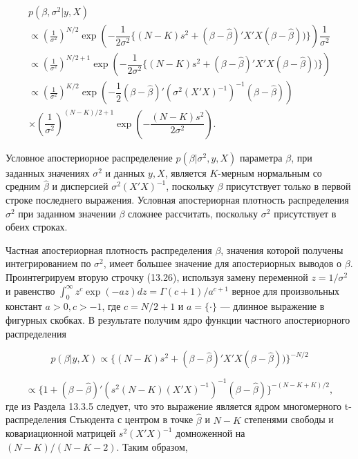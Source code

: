 \begin{multline}
p(\beta,\sigma^{2}|y,X) \\
\propto\left(\frac{1}{\sigma^2}\right)^{N/2}\exp\left(-\dfrac{1}{2\sigma^{2}}\lbrace(N-K)s^2+(\beta-\hat{\beta})'X'X(\beta-\hat{\beta}))\rbrace\right)\dfrac{1}{\sigma^2} \\
\propto\left(\frac{1}{\sigma^2}\right)^{N/2+1}\exp\left(-\dfrac{1}{2\sigma^{2}}\lbrace(N-K)s^2+(\beta-\hat{\beta})'X'X(\beta-\hat{\beta}))\rbrace\right) \\
\propto \left(\frac{1}{\sigma^2}\right)^{K/2}\exp\left(-\dfrac{1}{2}(\beta-\hat{\beta})'(\sigma^{2}(X'X)^{-1})^{-1}(\beta-\hat{\beta})\right)  \\ 
\times \left(\dfrac{1}{\sigma^2}\right)^{(N-K)/2+1}\exp\left(-\dfrac{(N-K)s^2}{2\sigma^2}\right)  .
\end{multline}

Условное апостериорное распределение $p(\beta|\sigma^2,y,X)$ параметра $\beta$, при заданных значениях $\sigma^2$ и данных $y,X$, является $K$-мерным нормальным со средним $\hat{\beta}$ и дисперсией $\sigma^{2}(X'X)^{-1}$, поскольку $\beta$ присутствует только в первой строке последнего выражения. Условная апостериорная плотность распределения $\sigma^2$ при заданном значении $\beta$ сложнее рассчитать, поскольку $\sigma^2$ присутствует в обеих строках.

Частная апостериорная плотность распределения $\beta$, значения которой получены интегрированием по $\sigma^2$, имеет большее значение для апостериорных выводов о  $\beta$. Проинтегрируем вторую строчку (13.26), используя замену переменной $z=1/\sigma^2$ и равенство $\int^{\infty}_{0}z^{c}\exp(-az)dz=\Gamma(c+1)/a^{c+1}$ верное для произвольных констант $a>0, c>-1$, где $c=N/2+1$ и $a=\lbrace\cdot\rbrace$ --- длинное выражение в фигурных скобках. В результате получим ядро функции частного апостериорного распределения

\begin{equation}
p(\beta|y,X){\propto}\lbrace(N-K)s^2+(\beta-\hat{\beta})'X'X(\beta-\hat{\beta}))\rbrace^{-N/2}
\end{equation}

\[
{\propto}\lbrace{1+(\beta-\hat{\beta})'(s^{2}(N-K)(X'X)^{-1})^{-1}(\beta-\hat{\beta})}\rbrace^{-(N-K+K)/2},
\]
где из Раздела 13.3.5 следует, что это выражение является ядром многомерного t-распределения Стьюдента с центром в точке $\hat{\beta}$ и $N-K$ степенями свободы и ковариационной матрицей $s^2(X'X)^{-1}$ домноженной на $(N-K)/(N-K-2)$. Таким образом,

